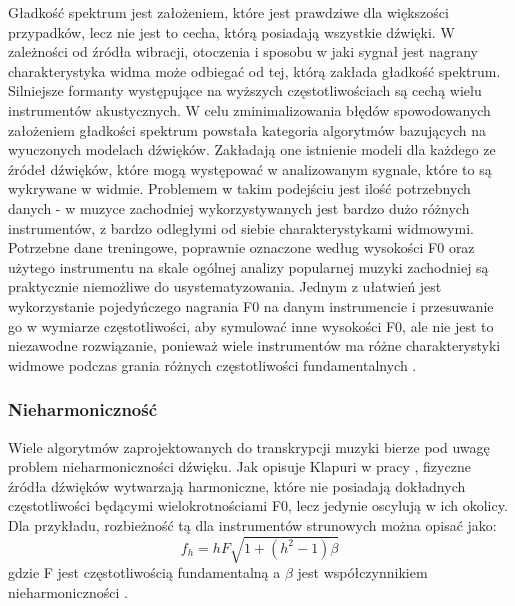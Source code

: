 \documentclass[12pt,a4paper,twoside]{mwart}
\begin{document}
Gładkość spektrum jest założeniem, które jest prawdziwe dla większości przypadków, lecz nie jest to cecha, którą posiadają wszystkie dźwięki. W zależności od źródła wibracji, otoczenia i sposobu w jaki sygnał jest nagrany charakterystyka widma może odbiegać od tej, którą zakłada gładkość spektrum. Silniejsze formanty występujące na wyższych częstotliwościach są cechą wielu instrumentów akustycznych. W celu zminimalizowania błędów spowodowanych założeniem gładkości spektrum powstała kategoria algorytmów bazujących na wyuczonych modelach dźwięków. Zakładają one istnienie modeli dla każdego ze źródeł dźwięków, które mogą występować w analizowanym sygnale, które to są wykrywane w widmie. Problemem w takim podejściu jest ilość potrzebnych danych - w muzyce zachodniej wykorzystywanych jest bardzo dużo różnych instrumentów, z bardzo odległymi od siebie charakterystykami widmowymi. Potrzebne dane treningowe, poprawnie oznaczone według wysokości F0 oraz użytego instrumentu na skale ogólnej analizy popularnej muzyki zachodniej są praktycznie niemożliwe do usystematyzowania. Jednym z ułatwień jest wykorzystanie pojedyńczego nagrania F0 na danym instrumencie i przesuwanie go w wymiarze częstotliwości, aby symulować inne wysokości F0, ale nie jest to niezawodne rozwiązanie, ponieważ wiele instrumentów ma różne charakterystyki widmowe podczas grania różnych częstotliwości fundamentalnych 
\cite[55-68]{Transcription:Quenneville:Thesis}
.

\subsubsection{Nieharmoniczność} \label{sec:multif0:inh:model}
Wiele algorytmów zaprojektowanych do transkrypcji muzyki bierze pod uwagę problem nieharmoniczności dźwięku. Jak opisuje Klapuri w pracy 
\cite[806-808]{Transcription:Klapuri:MultipleFundamentalFrequencyEstimation}
, fizyczne źródła dźwięków wytwarzają harmoniczne, które nie posiadają dokładnych częstotliwości będącymi wielokrotnościami F0, lecz jedynie oscylują w ich okolicy. Dla przykładu, rozbieżność tą dla instrumentów strunowych można opisać jako:
\begin{equation}\label{eq:inharmonicity:strings}
  f_h = hF \sqrt{1 + (h^2 - 1) \beta}
\end{equation}
gdzie F jest częstotliwością fundamentalną a $\beta$ jest współczynnikiem nieharmoniczności 
\cite[807]{Transcription:Klapuri:MultipleFundamentalFrequencyEstimation}
.
\end{document}
